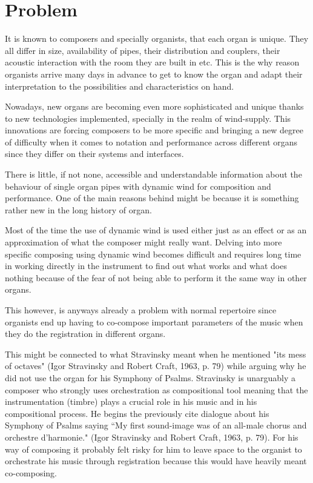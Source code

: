 \section{Problem}

It is known to composers and specially organists, that each organ is unique. They all differ in size, availability of pipes, their distribution and couplers, their acoustic interaction with the room they are built in etc. This is the why reason organists arrive many days in advance to get to know the organ and adapt their interpretation to the possibilities and characteristics on hand. 

Nowadays, new organs are becoming even more sophisticated and unique thanks to new technologies implemented, specially in the realm of wind-supply. This innovations are forcing composers to be more specific and bringing a new degree of difficulty when it comes to notation and performance across different organs since they differ on their systems and interfaces.

There is little, if not none, accessible and understandable information about the behaviour of single organ pipes with dynamic wind for composition and performance. One of the main reasons behind might be because it is something rather new in the long history of organ. 

Most of the time the use of dynamic wind is used either just as an effect or as an approximation of what the composer might really want. Delving into more specific composing using dynamic wind becomes difficult and requires long time in working directly in the instrument to find out what works and what does nothing because of the fear of not being able to perform it the same way in other organs. 

This however, is anyways already a problem with normal repertoire since organists end up having to co-compose important parameters of the music when they do the registration in different organs. 



This might be connected to what Stravinsky meant when he mentioned "its mess of octaves" (Igor Stravinsky and Robert Craft, 1963, p. 79) while arguing why he did not use the organ for his Symphony of Psalms. Stravinsky is unarguably a composer who strongly uses orchestration as compositional tool meaning that the instrumentation (timbre) plays a crucial role in his music and in his compositional process. He begins the previously cite dialogue about his Symphony of Psalms saying “My first sound-image was of an all-male chorus and orchestre d'harmonie." (Igor Stravinsky and Robert Craft, 1963, p. 79). For his way of composing it probably felt risky for him to leave space to the organist to orchestrate his music through registration because this would have heavily meant co-composing. 

